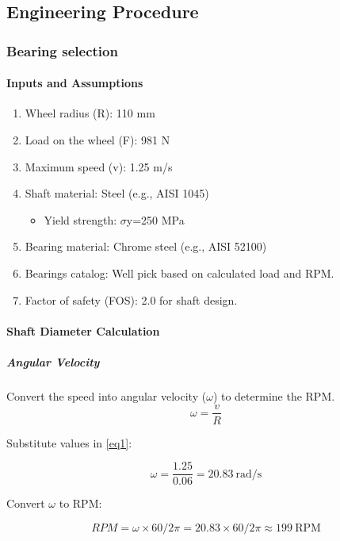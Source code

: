 \documentclass[../../main]{subfiles}
\begin{document}
\subsection{Engineering Procedure}

\subsubsection{Bearing selection}

\paragraph{Inputs and Assumptions}

\begin{enumerate}
\def\labelenumi{\arabic{enumi}.}
\item
  Wheel radius (R): 110 mm
\item
  Load on the wheel (F): 981 N
\item
  Maximum speed (v): 1.25 m/s
\item
  Shaft material: Steel (e.g., AISI 1045)

  \begin{itemize}
  \item
    Yield strength: $\sigma$y=250 MPa
  \end{itemize}
\item
  Bearing material: Chrome steel (e.g., AISI 52100)
\item
  Bearings catalog: We\textquotesingle ll pick based on
  calculated load and RPM.
\item
  Factor of safety (FOS): 2.0 for shaft design.
\end{enumerate}

\paragraph{ Shaft Diameter Calculation}

\subparagraph{Angular Velocity}
Convert the speed into angular velocity ($\omega$) to determine the RPM.
\begin{equation}
\omega = \frac{v}{R}
\label{eq1} 
\end{equation}

Substitute values in \cref{eq1}:

$$\omega = \frac{1.25}{0.06} = 20.83  \ \text{rad/s}$$

Convert $\omega$ to RPM:

$$ RPM = \omega \times 60/2\pi = 20.83 \times 60/2\pi \approx 199 \  \text{RPM}$$
\end{document}
